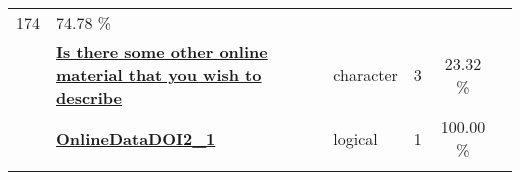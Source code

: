 \documentclass[]{article}
\begin{document}
\begin{longtable}[]{@{}lllrcl@{}}
\begin{minipage}[t]{0.10\columnwidth}
174\strut
\end{minipage} & \begin{minipage}[t]{0.10\columnwidth}\centering\strut
74.78 \%\strut
\end{minipage} & \begin{minipage}[t]{0.12\columnwidth}\raggedright\strut
\strut
\end{minipage}\tabularnewline
\begin{minipage}[t]{0.07\columnwidth}\raggedright\strut
\strut
\end{minipage} & \begin{minipage}[t]{0.35\columnwidth}\raggedright\strut
\textbf{\protect\hyperlink{is-there-some-other-online-material-that-you-wish-to-describe}{Is
there some other online material that you wish to describe}}\strut
\end{minipage} & \begin{minipage}[t]{0.11\columnwidth}\raggedright\strut
character\strut
\end{minipage} & \begin{minipage}[t]{0.10\columnwidth}\raggedleft\strut
3\strut
\end{minipage} & \begin{minipage}[t]{0.10\columnwidth}\centering\strut
23.32 \%\strut
\end{minipage} & \begin{minipage}[t]{0.12\columnwidth}\raggedright\strut
\strut
\end{minipage}\tabularnewline
\begin{minipage}[t]{0.07\columnwidth}\raggedright\strut
\strut
\end{minipage} & \begin{minipage}[t]{0.35\columnwidth}\raggedright\strut
\textbf{\protect\hyperlink{onlinedatadoi2_1}{OnlineDataDOI2\_1}}\strut
\end{minipage} & \begin{minipage}[t]{0.11\columnwidth}\raggedright\strut
logical\strut
\end{minipage} & \begin{minipage}[t]{0.10\columnwidth}\raggedleft\strut
1\strut
\end{minipage} & \begin{minipage}[t]{0.10\columnwidth}\centering\strut
100.00 \%\strut
\end{minipage} & \begin{minipage}[t]{0.12\columnwidth}\raggedright\strut
\strut
\end{minipage}\tabularnewline
\begin{minipage}[t]{0.07\columnwidth}\raggedright\strut

\end{minipage}
\end{longtable}
\end{document}
